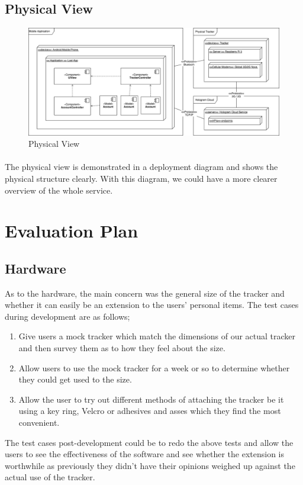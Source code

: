 \documentclass[12pt,a4paper]{article}
\begin{document}
      \subsection{Physical View}
        \begin{figure}[H]
          \centering
          \includegraphics[width=1\textwidth]{assets/7-technical-architecture-physical.jpg}
          \caption{Physical View}
          \label{fig:Physical View}
        \end{figure}
        \paragraph{}
          The physical view is demonstrated in a deployment diagram and shows the physical structure clearly. With this diagram, we could have a more clearer overview of the whole service.
       
    \section{Evaluation Plan}
      \subsection{Hardware}
        As to the hardware, the main concern was the general size of the tracker and whether it can easily be an extension to the users’ personal items. The test cases during development are as follows;
        \begin{enumerate}
          \item Give users a mock tracker which match the dimensions of our actual tracker and then survey them as to how they feel about the size.
          \item Allow users to use the mock tracker for a week or so to determine whether they could get used to the size.
          \item Allow the user to try out different methods of attaching the tracker be it using a key ring, Velcro or adhesives and asses which they find the most convenient.
        \end{enumerate}
        The test cases post-development could be to redo the above tests and allow the users to see the effectiveness of the software and see whether the extension is worthwhile as previously they didn’t have their opinions weighed up against the actual use of the tracker.
      
\end{document}
